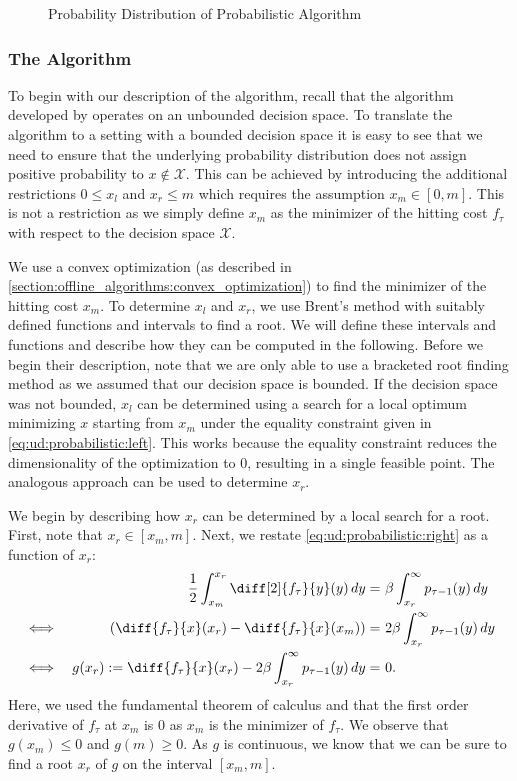 \begin{figure}
    \centering
    [TODO]

    \caption{Probability Distribution of Probabilistic Algorithm}
    \label{fig:probability_distribution_of_probabilistic_algorithm}
\end{figure}

\subsubsection{The Algorithm}

To begin with our description of the algorithm, recall that the algorithm developed by \citeauthor*{Bansal2015} operates on an unbounded decision space. To translate the algorithm to a setting with a bounded decision space it is easy to see that we need to ensure that the underlying probability distribution does not assign positive probability to $x \not\in \mathcal{X}$. This can be achieved by introducing the additional restrictions $0 \leq x_l$ and $x_r \leq m$ which requires the assumption $x_m \in [0,m]$. This is not a restriction as we simply define $x_m$ as the minimizer of the hitting cost $f_{\tau}$ with respect to the decision space $\mathcal{X}$.

We use a convex optimization (as described in \autoref{section:offline_algorithms:convex_optimization}) to find the minimizer of the hitting cost $x_m$. To determine $x_l$ and $x_r$, we use Brent's method with suitably defined functions and intervals to find a root. We will define these intervals and functions and describe how they can be computed in the following. Before we begin their description, note that we are only able to use a bracketed root finding method as we assumed that our decision space is bounded. If the decision space was not bounded, $x_l$ can be determined using a search for a local optimum minimizing $x$ starting from $x_m$ under the equality constraint given in \autoref{eq:ud:probabilistic:left}. This works because the equality constraint reduces the dimensionality of the optimization to $0$, resulting in a single feasible point. The analogous approach can be used to determine $x_r$.

We begin by describing how $x_r$ can be determined by a local search for a root. First, note that $x_r \in [x_m,m]$. Next, we restate \autoref{eq:ud:probabilistic:right} as a function of $x_r$: \begin{align*}
    && \frac{1}{2} \int_{x_m}^{x_r} \diff[2]{f_{\tau}}{y}(y) \,dy =&\ \beta \int_{x_r}^{\infty} p_{\tau-1}(y) \,dy \\
    \iff&& \left(\diff{f_{\tau}}{x}(x_r) - \diff{f_{\tau}}{x}(x_m)\right) =&\ 2 \beta \int_{x_r}^{\infty} p_{\tau-1}(y) \,dy \\
    \iff&& g(x_r) := \diff{f_{\tau}}{x}(x_r) - 2 \beta \int_{x_r}^{\infty} p_{\tau-1}(y) \,dy =&\ 0.
\end{align*} Here, we used the fundamental theorem of calculus and that the first order derivative of $f_{\tau}$ at $x_m$ is $0$ as $x_m$ is the minimizer of $f_{\tau}$. We observe that $g(x_m) \leq 0$ and $g(m) \geq 0$. As $g$ is continuous, we know that we can be sure to find a root $x_r$ of $g$ on the interval $[x_m,m]$.


